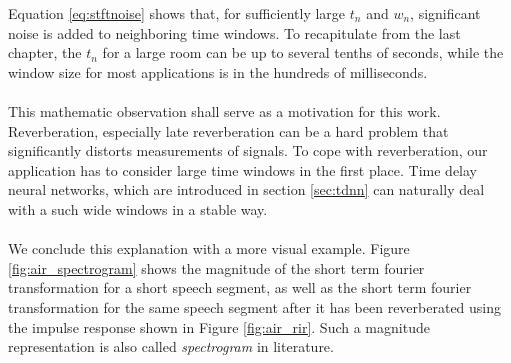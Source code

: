 Equation \ref{eq:stftnoise} shows that, for sufficiently large $t_n$ and $w_n$, significant noise is added to neighboring time windows. To recapitulate from the last chapter, the $t_n$ for a large room can be up to several tenths of seconds, while the window size for most applications is in the hundreds of milliseconds. 
\\ \\
This mathematic observation shall serve as a motivation for this work. Reverberation, especially late reverberation can be a hard problem that significantly distorts measurements of signals. To cope with reverberation, our application has to consider large time windows in the first place. Time delay neural networks, which are introduced in section \ref{sec:tdnn} can naturally deal with a such wide windows in a stable way. 
\\ \\
We conclude this explanation with a more visual example. Figure \ref{fig:air_spectrogram} shows the magnitude of the short term fourier transformation for a short speech segment, as well as the short term fourier transformation for the same speech segment after it has been reverberated using the impulse response shown in Figure \ref{fig:air_rir}. Such a magnitude representation is also called \textit{spectrogram} in literature. 


\begin{minipage}{\linewidth}
	\label{fig:air_spectrogram}
\end{minipage}


